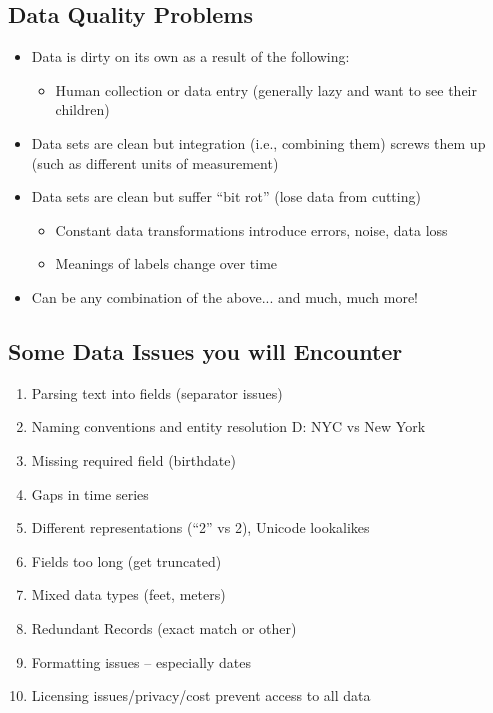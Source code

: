 \documentclass[11pt]{article}
\theoremstyle{definition}
\begin{document}
\subsection{Data Quality Problems}
\begin{itemize}
    \item Data is dirty on its own as a result of the following:
    \begin{itemize}
        \item Human collection or data entry (generally lazy and want to see their children)
    \end{itemize}
    \item Data sets are clean but integration (i.e., combining them)
    screws them up (such as different units of measurement)
    \item Data sets are clean but suffer “bit rot” (lose data from cutting)
    \begin{itemize}
        \item Constant data transformations introduce errors, noise, data loss
        \item Meanings of labels change over time
    \end{itemize}
    \item Can be any combination of the above... and much, much more!
\end{itemize}

\subsection{Some Data Issues you will Encounter}
\begin{enumerate}
    \item Parsing text into fields (separator issues)
    \item Naming conventions and entity resolution D: NYC vs New York
    \item Missing required field (birthdate)
    \item Gaps in time series
    \item Different representations (“2” vs 2), Unicode lookalikes
    \item Fields too long (get truncated)
    \item Mixed data types (feet, meters)
    \item Redundant Records (exact match or other)
    \item Formatting issues – especially dates
    \item Licensing issues/privacy/cost prevent access to all data
\end{enumerate}
\end{document}

